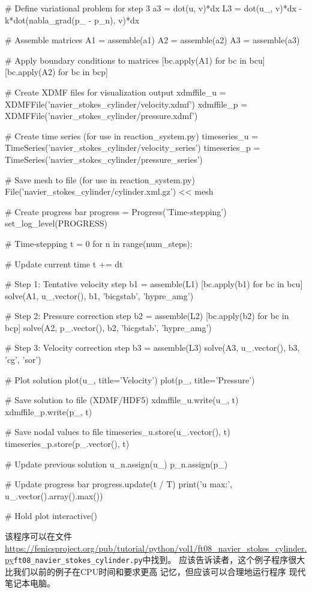 \begin{python}
# Define variational problem for step 3
a3 = dot(u, v)*dx
L3 = dot(u_, v)*dx - k*dot(nabla_grad(p_ - p_n), v)*dx

# Assemble matrices
A1 = assemble(a1)
A2 = assemble(a2)
A3 = assemble(a3)

# Apply boundary conditions to matrices
[bc.apply(A1) for bc in bcu]
[bc.apply(A2) for bc in bcp]

# Create XDMF files for visualization output
xdmffile_u = XDMFFile('navier_stokes_cylinder/velocity.xdmf')
xdmffile_p = XDMFFile('navier_stokes_cylinder/pressure.xdmf')

# Create time series (for use in reaction_system.py)
timeseries_u = TimeSeries('navier_stokes_cylinder/velocity_series')
timeseries_p = TimeSeries('navier_stokes_cylinder/pressure_series')

# Save mesh to file (for use in reaction_system.py)
File('navier_stokes_cylinder/cylinder.xml.gz') << mesh

# Create progress bar
progress = Progress('Time-stepping')
set_log_level(PROGRESS)

# Time-stepping
t = 0
for n in range(num_steps):

    # Update current time
    t += dt

    # Step 1: Tentative velocity step
    b1 = assemble(L1)
    [bc.apply(b1) for bc in bcu]
    solve(A1, u_.vector(), b1, 'bicgstab', 'hypre_amg')

    # Step 2: Pressure correction step
    b2 = assemble(L2)
    [bc.apply(b2) for bc in bcp]
    solve(A2, p_.vector(), b2, 'bicgstab', 'hypre_amg')

    # Step 3: Velocity correction step
    b3 = assemble(L3)
    solve(A3, u_.vector(), b3, 'cg', 'sor')

    # Plot solution
    plot(u_, title='Velocity')
    plot(p_, title='Pressure')

    # Save solution to file (XDMF/HDF5)
    xdmffile_u.write(u_, t)
    xdmffile_p.write(p_, t)

    # Save nodal values to file
    timeseries_u.store(u_.vector(), t)
    timeseries_p.store(p_.vector(), t)

    # Update previous solution
    u_n.assign(u_)
    p_n.assign(p_)

    # Update progress bar
    progress.update(t / T)
    print('u max:', u_.vector().array().max())

# Hold plot
interactive()
\end{python}
该程序可以在文件\url{https://fenicsproject.org/pub/tutorial/python/vol1/ft08_navier_stokes_cylinder.py}{\nolinkurl{ft08_navier_stokes_cylinder.py}}中找到。
应该告诉读者，这个例子程序很大
比我们以前的例子在CPU时间和要求更高
记忆，但应该可以合理地运行程序
现代笔记本电脑。

